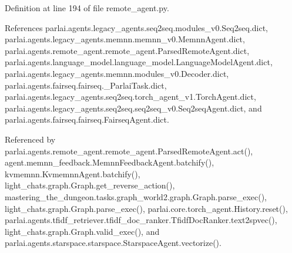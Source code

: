 Definition at line 194 of file remote\+\_\+agent.\+py.



References parlai.\+agents.\+legacy\+\_\+agents.\+seq2seq.\+modules\+\_\+v0.\+Seq2seq.\+dict, parlai.\+agents.\+legacy\+\_\+agents.\+memnn.\+memnn\+\_\+v0.\+Memnn\+Agent.\+dict, parlai.\+agents.\+remote\+\_\+agent.\+remote\+\_\+agent.\+Parsed\+Remote\+Agent.\+dict, parlai.\+agents.\+language\+\_\+model.\+language\+\_\+model.\+Language\+Model\+Agent.\+dict, parlai.\+agents.\+legacy\+\_\+agents.\+memnn.\+modules\+\_\+v0.\+Decoder.\+dict, parlai.\+agents.\+fairseq.\+fairseq.\+\_\+\+Parlai\+Task.\+dict, parlai.\+agents.\+legacy\+\_\+agents.\+seq2seq.\+torch\+\_\+agent\+\_\+v1.\+Torch\+Agent.\+dict, parlai.\+agents.\+legacy\+\_\+agents.\+seq2seq.\+seq2seq\+\_\+v0.\+Seq2seq\+Agent.\+dict, and parlai.\+agents.\+fairseq.\+fairseq.\+Fairseq\+Agent.\+dict.



Referenced by parlai.\+agents.\+remote\+\_\+agent.\+remote\+\_\+agent.\+Parsed\+Remote\+Agent.\+act(), agent.\+memnn\+\_\+feedback.\+Memnn\+Feedback\+Agent.\+batchify(), kvmemnn.\+Kvmemnn\+Agent.\+batchify(), light\+\_\+chats.\+graph.\+Graph.\+get\+\_\+reverse\+\_\+action(), mastering\+\_\+the\+\_\+dungeon.\+tasks.\+graph\+\_\+world2.\+graph.\+Graph.\+parse\+\_\+exec(), light\+\_\+chats.\+graph.\+Graph.\+parse\+\_\+exec(), parlai.\+core.\+torch\+\_\+agent.\+History.\+reset(), parlai.\+agents.\+tfidf\+\_\+retriever.\+tfidf\+\_\+doc\+\_\+ranker.\+Tfidf\+Doc\+Ranker.\+text2spvec(), light\+\_\+chats.\+graph.\+Graph.\+valid\+\_\+exec(), and parlai.\+agents.\+starspace.\+starspace.\+Starspace\+Agent.\+vectorize().

